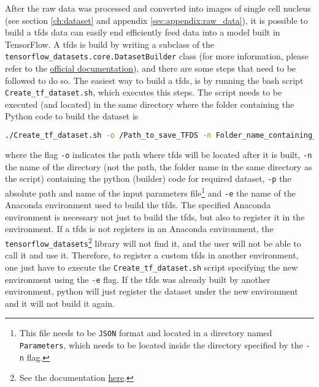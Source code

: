 
\glsresetall

After the raw data was processed and converted into images of single cell nucleus (see section \ref{ch:dataset} and appendix \ref{sec:appendix:raw_data}), it is possible to build a \gls{tfds} data can easily end efficiently feed data into a model built in TensorFlow. A \acrlong{tfds} is build by writing a subclass of the \texttt{tensorflow\_datasets.core.DatasetBuilder} class (for more information, please refer to the \href{https://www.tensorflow.org/datasets/add_dataset}{official documentation}), and there are some steps that need to be followed to do so. The easiest way to build a \gls{tfds}, is by running the bash script \texttt{Create\_tf\_dataset.sh}, which executes this steps. The script needs to be executed (and located) in the same directory where the folder containing the Python code to build the dataset is

\begin{lstlisting}[language=Bash]
  ./Create_tf_dataset.sh -o /Path_to_save_TFDS -n Folder_name_containing_the_TFDS_builder_code -p /Path_to_parameters_files/parameters_file.json -e my_conda_env_name
\end{lstlisting}

\noindent where the flag \texttt{-o} indicates the path where \gls{tfds} will be located after it is built, \texttt{-n} the name of the directory (not the path, the folder name in the same directory as the script) containing the python (builder) code for required dataset, \texttt{-p} the absolute path and name of the input parameters file\footnote{This file needs to be \texttt{JSON} format and located in a directory named \texttt{Parameters}, which needs to be located inside the directory specified by the \texttt{-n} flag.} and \texttt{-e} the name of the Anaconda environment used to build the \gls{tfds}.
The specified Anaconda environment is necessary not just to build the \gls{tfds}, but also to register it in the environment. If a \gls{tfds} is not registers in an Anaconda environment, the \texttt{tensorflow\_datasets}\footnote{See the documentation \href{https://www.tensorflow.org/datasets}{here}.} library will not find it, and the user will not be able to call it and use it. Therefore, to register a custom \gls{tfds} in another environment, one just have to execute the \texttt{Create\_tf\_dataset.sh} script specifying the new environment using the \texttt{-e} flag. If the \gls{tfds} was already built by another environment, python will just register the dataset under the new environment and it will not build it again.

